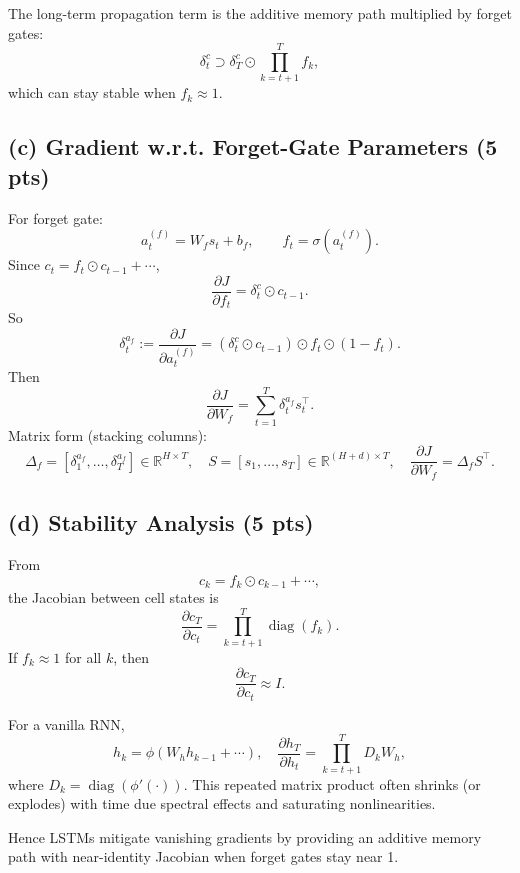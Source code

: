 \documentclass[11pt]{article}
\begin{document}
The long-term propagation term is the additive memory path multiplied by forget gates:
\[
\delta_t^c \supset \delta_T^c \odot \prod_{k=t+1}^{T} f_k,
\]
which can stay stable when $f_k\approx 1$.

\subsection*{(c) Gradient w.r.t. Forget-Gate Parameters (5 pts)}

For forget gate:
\[
a_t^{(f)} = W_f s_t + b_f,
\qquad
f_t = \sigma(a_t^{(f)}).
\]
Since $c_t = f_t\odot c_{t-1}+\cdots$,
\[
\frac{\partial J}{\partial f_t} = \delta_t^c \odot c_{t-1}.
\]
So
\[
\delta_t^{a_f}
:= \frac{\partial J}{\partial a_t^{(f)}}
= \left(\delta_t^c \odot c_{t-1}\right) \odot f_t\odot(1-f_t).
\]
Then
\[
\boxed{
\frac{\partial J}{\partial W_f}
= \sum_{t=1}^{T} \delta_t^{a_f} s_t^\top.
}
\]
Matrix form (stacking columns):
\[
\Delta_f = [\delta_1^{a_f},\dots,\delta_T^{a_f}]\in\mathbb{R}^{H\times T},
\quad
S=[s_1,\dots,s_T]\in\mathbb{R}^{(H+d)\times T},
\quad
\frac{\partial J}{\partial W_f}=\Delta_f S^\top.
\]

\subsection*{(d) Stability Analysis (5 pts)}

From
\[
c_k = f_k\odot c_{k-1}+\cdots,
\]
the Jacobian between cell states is
\[
\frac{\partial c_T}{\partial c_t}
= \prod_{k=t+1}^{T} \operatorname{diag}(f_k).
\]
If $f_k\approx 1$ for all $k$, then
\[
\boxed{\frac{\partial c_T}{\partial c_t} \approx I.}
\]

For a vanilla RNN,
\[
h_k = \phi(W_h h_{k-1}+\cdots),
\quad
\frac{\partial h_T}{\partial h_t}
= \prod_{k=t+1}^{T} D_k W_h,
\]
where $D_k=\operatorname{diag}(\phi'(\cdot))$.
This repeated matrix product often shrinks (or explodes) with time due spectral effects and saturating nonlinearities.

Hence LSTMs mitigate vanishing gradients by providing an additive memory path with near-identity Jacobian when forget gates stay near 1.

\newpage
\end{document}
